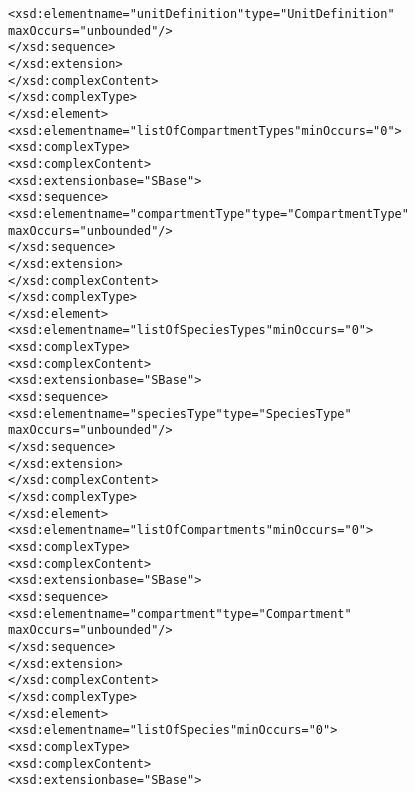 \begin{alltt}
                                        <xsd:element name="unitDefinition" type="UnitDefinition"
                                            maxOccurs="unbounded"/>
                                    </xsd:sequence>
                                </xsd:extension>
                            </xsd:complexContent>
                        </xsd:complexType>
                    </xsd:element>
                    <xsd:element name="listOfCompartmentTypes" minOccurs="0">
                        <xsd:complexType>
                            <xsd:complexContent>
                                <xsd:extension base="SBase">
                                    <xsd:sequence>
                                        <xsd:element name="compartmentType" type="CompartmentType"
                                            maxOccurs="unbounded"/>
                                    </xsd:sequence>
                                </xsd:extension>
                            </xsd:complexContent>
                        </xsd:complexType>
                    </xsd:element>
                    <xsd:element name="listOfSpeciesTypes" minOccurs="0">
                        <xsd:complexType>
                            <xsd:complexContent>
                                <xsd:extension base="SBase">
                                    <xsd:sequence>
                                        <xsd:element name="speciesType" type="SpeciesType"
                                            maxOccurs="unbounded"/>
                                    </xsd:sequence>
                                </xsd:extension>
                            </xsd:complexContent>
                        </xsd:complexType>
                    </xsd:element>
                    <xsd:element name="listOfCompartments" minOccurs="0">
                        <xsd:complexType>
                            <xsd:complexContent>
                                <xsd:extension base="SBase">
                                    <xsd:sequence>
                                        <xsd:element name="compartment" type="Compartment"
                                            maxOccurs="unbounded"/>
                                    </xsd:sequence>
                                </xsd:extension>
                            </xsd:complexContent>
                        </xsd:complexType>
                    </xsd:element>
                    <xsd:element name="listOfSpecies" minOccurs="0">
                        <xsd:complexType>
                            <xsd:complexContent>
                                <xsd:extension base="SBase">

\end{alltt}
